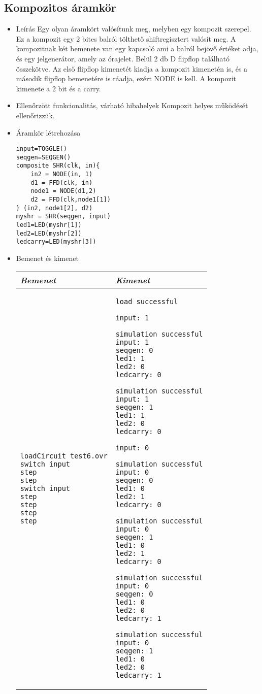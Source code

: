 \subsection{Kompozitos áramkör}
\begin{itemize}
\item Leírás\newline
Egy olyan áramkört valósítunk meg, melyben egy kompozit szerepel. Ez a kompozit egy 2 bites balról tölthető shiftregisztert valósít meg. A kompozitnak két bemenete van egy kapcsoló ami a balról bejövő értéket adja, és egy jelgenerátor, amely az órajelet. Belül 2 db D flipflop található összekötve. Az első flipflop kimenetét kiadja a kompozit kimenetén is, és a második flipflop bemenetére is ráadja, ezért NODE is kell. A kompozit kimenete a 2 bit és a carry.
\item Ellenőrzött funkcionalitás, várható hibahelyek\newline
Kompozit helyes működését ellenőrizzük.

\item Áramkör létrehozása

\begin{verbatim}
input=TOGGLE()
seqgen=SEQGEN()
composite SHR(clk, in){
    in2 = NODE(in, 1)
    d1 = FFD(clk, in)
    node1 = NODE(d1,2)
    d2 = FFD(clk,node1[1])
} (in2, node1[2], d2)
myshr = SHR(seqgen, input)
led1=LED(myshr[1])
led2=LED(myshr[2])
ledcarry=LED(myshr[3])
\end{verbatim}

\item Bemenet és kimenet\newline

\begin{tabular}{|p{7cm}|p{7cm}|} 
\hline 
\textit{Bemenet} & \textit{Kimenet} \\ \hline
\begin{verbatim}
loadCircuit test6.ovr
switch input
step
step
switch input
step
step
step
step
\end{verbatim}
& 
\begin{verbatim}
load successful

input: 1

simulation successful
input: 1
seqgen: 0
led1: 1
led2: 0
ledcarry: 0

simulation successful
input: 1
seqgen: 1
led1: 1
led2: 0
ledcarry: 0

input: 0

simulation successful
input: 0
seqgen: 0
led1: 0
led2: 1
ledcarry: 0

simulation successful
input: 0
seqgen: 1
led1: 0
led2: 1
ledcarry: 0

simulation successful
input: 0
seqgen: 0
led1: 0
led2: 0
ledcarry: 1

simulation successful
input: 0
seqgen: 1
led1: 0
led2: 0
ledcarry: 1
\end{verbatim}
\\ \hline
\end{tabular}

\end{itemize}


